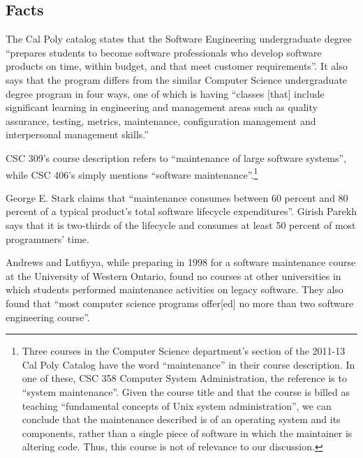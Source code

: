\documentclass[11pt]{article}
\begin{document}
\begin{multicols}{2}
\setcounter{page}{1}
\section{Facts}

The Cal Poly catalog states that the Software Engineering undergraduate degree ``prepares students to become software professionals who develop software 
products on time, within budget, and that meet customer requirements''. \cite{catalogDept}  It also says that the program differs from the similar Computer Science undergraduate degree program in four ways, one of which is having ``classes [that] include significant learning in engineering and management areas such as quality assurance, testing, metrics, maintenance, configuration management and interpersonal management skills.'' \cite{catalogDept}

CSC 309's course description refers to ``maintenance of large software systems'', while CSC 406's simply mentions ``software maintenance''.\footnote[1]{Three courses in the Computer Science department's section of the 2011-13 Cal Poly Catalog have the word ``maintenance'' in their course description. \cite{catalogCourses}  In one of these, CSC 358 Computer System Administration, the reference is to ``system maintenance''. \cite{catalogCourses}  Given the course title and that the course is billed as teaching ``fundamental concepts of Unix system administration'', \cite{catalogCourses} we can conclude that the maintenance described is of an operating system and its components, rather than a single piece of software in which the maintainer is altering code.  Thus, this course is not of relevance to our discussion.} \cite{catalogCourses}

George E. Stark claims that ``maintenance consumes between 60 percent and 80 percent of a typical product's total software lifecycle expenditures''. \cite{stark97}  Girish Parekh says that it is two-thirds of the lifecycle and consumes at least 50 percent of most programmers' time. \cite{parekh}

Andrews and Lutfiyya, while preparing in 1998 for a software maintenance course at the University of Western Ontario, found no courses at other universities in which students performed maintenance activities on legacy software. \cite{andrews} They also found that ``most computer science programs offer[ed] no more than two software engineering course''. \cite{andrews}


\end{multicols}
\end{document}
